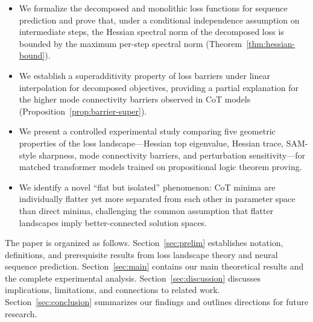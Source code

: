 \begin{itemize}[leftmargin=*,itemsep=0pt,topsep=4pt]
\item We formalize the decomposed and monolithic loss functions for sequence
  prediction and prove that, under a conditional independence assumption on
  intermediate steps, the Hessian spectral norm of the decomposed loss is bounded
  by the maximum per-step spectral norm (Theorem~\ref{thm:hessian-bound}).

\item We establish a superadditivity property of loss barriers under linear
  interpolation for decomposed objectives, providing a partial explanation for the
  higher mode connectivity barriers observed in CoT models
  (Proposition~\ref{prop:barrier-super}).

\item We present a controlled experimental study comparing five geometric
  properties of the loss landscape---Hessian top eigenvalue, Hessian trace,
  SAM-style sharpness, mode connectivity barriers, and perturbation
  sensitivity---for matched transformer models trained on propositional logic
  theorem proving.

\item We identify a novel ``flat but isolated'' phenomenon: CoT minima are
  individually flatter yet more separated from each other in parameter space
  than direct minima, challenging the common assumption that flatter landscapes
  imply better-connected solution spaces.
\end{itemize}

The paper is organized as follows. Section~\ref{sec:prelim} establishes
notation, definitions, and prerequisite results from loss landscape theory and
neural sequence prediction. Section~\ref{sec:main} contains our main
theoretical results and the complete experimental analysis.
Section~\ref{sec:discussion} discusses implications, limitations, and
connections to related work. Section~\ref{sec:conclusion} summarizes our
findings and outlines directions for future research.
